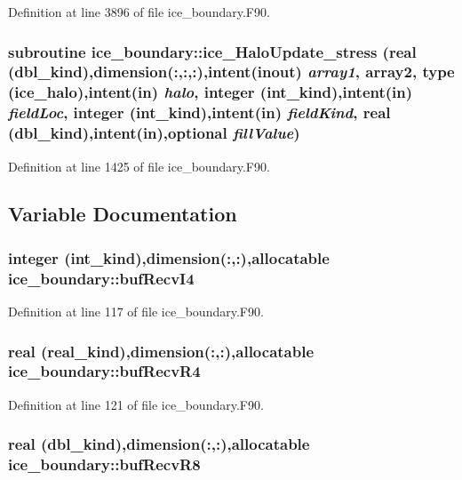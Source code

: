 Definition at line 3896 of file ice\_\-boundary.F90.\hypertarget{namespaceice__boundary_abc01c17b506f2d8ae4df422170803c6a}{
\subsubsection[{ice\_\-HaloUpdate\_\-stress}]{\setlength{\rightskip}{0pt plus 5cm}subroutine ice\_\-boundary::ice\_\-HaloUpdate\_\-stress (real (dbl\_\-kind),dimension(:,:,:),intent(inout) {\em array1}, \/  array2, \/  type (ice\_\-halo),intent(in) {\em halo}, \/  integer (int\_\-kind),intent(in) {\em fieldLoc}, \/  integer (int\_\-kind),intent(in) {\em fieldKind}, \/  real (dbl\_\-kind),intent(in),optional {\em fillValue})}}
\label{namespaceice__boundary_abc01c17b506f2d8ae4df422170803c6a}


Definition at line 1425 of file ice\_\-boundary.F90.

\subsection{Variable Documentation}
\hypertarget{namespaceice__boundary_a59b118d50a3fe964e4109999b54f432b}{
\subsubsection[{bufRecvI4}]{\setlength{\rightskip}{0pt plus 5cm}integer (int\_\-kind),dimension(:,:),allocatable {\bf ice\_\-boundary::bufRecvI4}}}
\label{namespaceice__boundary_a59b118d50a3fe964e4109999b54f432b}


Definition at line 117 of file ice\_\-boundary.F90.\hypertarget{namespaceice__boundary_a9924032ec4c94a255c40c319d1577a08}{
\subsubsection[{bufRecvR4}]{\setlength{\rightskip}{0pt plus 5cm}real (real\_\-kind),dimension(:,:),allocatable {\bf ice\_\-boundary::bufRecvR4}}}
\label{namespaceice__boundary_a9924032ec4c94a255c40c319d1577a08}


Definition at line 121 of file ice\_\-boundary.F90.\hypertarget{namespaceice__boundary_a8322278cdca5c48f9a5bad7118fcbecd}{
\subsubsection[{bufRecvR8}]{\setlength{\rightskip}{0pt plus 5cm}real (dbl\_\-kind),dimension(:,:),allocatable {\bf ice\_\-boundary::bufRecvR8}}}
\label{namespaceice__boundary_a8322278cdca5c48f9a5bad7118fcbecd}


